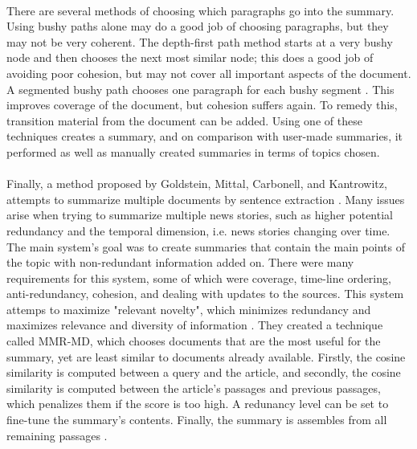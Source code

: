 \documentclass[11pt,titlepage]{report}
\begin{document}
\paragraph{}
There are several methods of choosing which paragraphs go into the summary. Using bushy paths alone may do a good job of choosing paragraphs, but they may not be very coherent. The depth-first path method starts at a very bushy node and then chooses the next most similar node; this does a good job of avoiding poor cohesion, but may not cover all important aspects of the document. A segmented bushy path chooses one paragraph for each bushy segment \cite{automatic}. This improves coverage of the document, but cohesion suffers again. To remedy this, transition material from the document can be added. Using one of these techniques creates a summary, and on comparison with user-made summaries, it performed as well as manually created summaries in terms of topics chosen. 
\paragraph{}
Finally, a method proposed by Goldstein, Mittal, Carbonell, and Kantrowitz, attempts to summarize multiple documents by sentence extraction \cite{multidoc_summ}. Many issues arise when trying to summarize multiple news stories, such as higher potential redundancy and the temporal dimension, i.e. news stories changing over time. The main system's goal was to create summaries that contain the main points of the topic with non-redundant information added on. There were many requirements for this system, some of which were coverage, time-line ordering, anti-redundancy, cohesion, and dealing with updates to the sources. This system attemps to maximize "relevant novelty", which minimizes redundancy and maximizes relevance and diversity of information \cite{multidoc_summ}. They created a technique called MMR-MD, which chooses documents that are the most useful for the summary, yet are least similar to documents already available. Firstly, the cosine similarity is computed between a query and the article, and secondly, the cosine similarity is computed between the article's passages and previous passages, which penalizes them if the score is too high. A redunancy level can be set to fine-tune the summary's contents. Finally, the summary is assembles from all remaining passages \cite{multidoc_summ}. 
\end{document}
